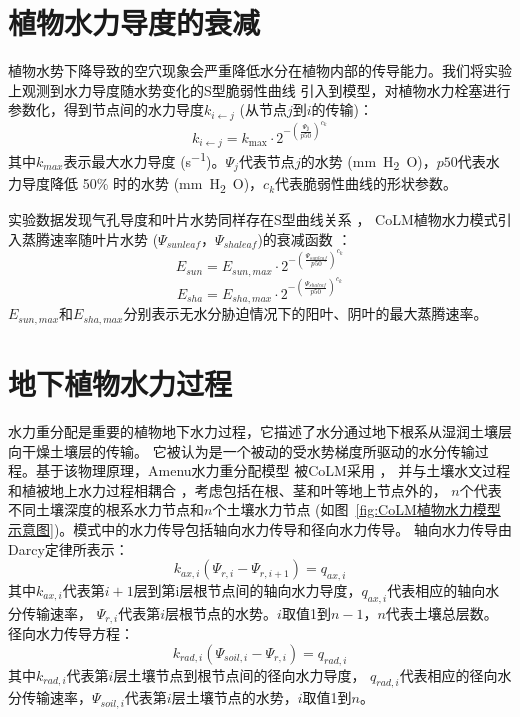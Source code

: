 \section{植物水力导度的衰减}\label{植物水力导度的衰减}
植物水势下降导致的空穴现象会严重降低水分在植物内部的传导能力。我们将实验上观测到水力导度随水势变化的S型脆弱性曲线 
\citep{sperry1988method,gentine2016allometry,neufeld1992genotypic,pammenter1998mathematical,plaut2012hydraulic}
 引入到模型，对植物水力栓塞进行参数化，得到节点间的水力导度$k_{i\gets j}$ (从节点$j$到$i$的传输)：
\begin{equation}
k_{i \leftarrow j}=k_{\max } \cdot 2^{-\left(\frac{\Psi_{\mathbf{j}}}{p 50}\right)^{c_{k}}}
\end{equation}
其中$k_{max}$表示最大水力导度 (\unit{s^{-1}})。$\Psi_j$代表节点$j$的水势 (\unit{mm.H_2O})，$p50$代表水力导度降低 50\% 时的水势 (\unit{mm.H_2O})，$c_k$代表脆弱性曲线的形状参数。


实验数据发现气孔导度和叶片水势同样存在S型曲线关系 \citep{klein2014variability}，
CoLM植物水力模式引入蒸腾速率随叶片水势 ($\Psi_{sunleaf}$，$\Psi_{shaleaf}$)的衰减函数 \citep{kennedy2019implementing}：
\begin{equation}\label{e_sun_a}
E_{ {sun }}=E_{ {sun,max }} \cdot 2^{-\left(\frac{\Psi_{ {sunleaf }}}{p 50}\right)^{c_{k}}}
\end{equation}
\begin{equation}\label{e_sha_a}
E_{ {sha }}=E_{ {sha,max }} \cdot 2^{-\left(\frac{\Psi_{ {shaleaf }}}{p 50}\right)^{c_{k}}}
\end{equation}
$E_{sun,max} $和$E_{sha,max}$分别表示无水分胁迫情况下的阳叶、阴叶的最大蒸腾速率。


\section{地下植物水力过程}\label{地下植物水力过程}
水力重分配是重要的植物地下水力过程，它描述了水分通过地下根系从湿润土壤层向干燥土壤层的传输。
它被认为是一个被动的受水势梯度所驱动的水分传输过程。基于该物理原理，Amenu水力重分配模型 \citep{amenu2008}被CoLM采用 \citep{zhu2017incorporating}，
并与土壤水文过程和植被地上水力过程相耦合 \citep{li2021new}，考虑包括在根、茎和叶等地上节点外的， 
$n$个代表不同土壤深度的根系水力节点和$n$个土壤水力节点 (如图~\ref{fig:CoLM植物水力模型示意图})。模式中的水力传导包括轴向水力传导和径向水力传导。
轴向水力传导由Darcy定律所表示：
\begin{equation}\label{k_axi}
k_{ax,i}\left(\Psi_{r,i}-\Psi_{r,i+1}\right)=q_{ax,i}
\end{equation}
其中$k_{ax,i}$代表第$i+1$层到第i层根节点间的轴向水力导度，$q_{ax,i}$代表相应的轴向水分传输速率，
$\Psi_{r,i}$代表第$i$层根节点的水势。$i$取值1到$n-1$，$n$代表土壤总层数。\\
径向水力传导方程：
\begin{equation}\label{k_radi}
k_{rad,i}\left(\Psi_{soil,i}-\Psi_{r,i}\right)=q_{rad,i}
\end{equation}
其中$k_{rad,i}$代表第$i$层土壤节点到根节点间的径向水力导度，
$q_{rad,i}$代表相应的径向水分传输速率，$\Psi_{soil,i}$代表第$i$层土壤节点的水势，$i$取值1到$n$。




